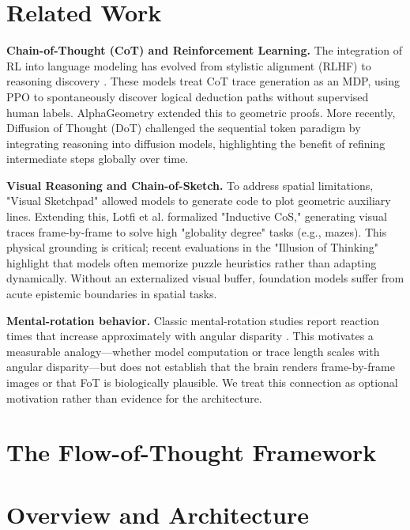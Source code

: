 \documentclass{article}
\begin{document}
\section{Related Work}

\textbf{Chain-of-Thought (CoT) and Reinforcement Learning.} The integration of RL into language modeling has evolved from stylistic alignment (RLHF) \citep{ouyang2022training} to reasoning discovery \citep{deepseek2025deepseekr1, openai2024o1}. These models treat CoT trace generation as an MDP, using PPO to spontaneously discover logical deduction paths without supervised human labels. AlphaGeometry \citep{trinh2024solving} extended this to geometric proofs. More recently, Diffusion of Thought (DoT) \citep{ye2024diffusion} challenged the sequential token paradigm by integrating reasoning into diffusion models, highlighting the benefit of refining intermediate steps globally over time.

\textbf{Visual Reasoning and Chain-of-Sketch.} To address spatial limitations, "Visual Sketchpad" \citep{hu2024visual} allowed models to generate code to plot geometric auxiliary lines. Extending this, Lotfi et al. \cite{lotfi2024cos} formalized "Inductive CoS," generating visual traces frame-by-frame to solve high "globality degree" tasks (e.g., mazes). This physical grounding is critical; recent evaluations in the "Illusion of Thinking" \cite{shojaee2025illusion} highlight that models often memorize puzzle heuristics rather than adapting dynamically. Without an externalized visual buffer, foundation models suffer from acute epistemic boundaries in spatial tasks.

\textbf{Mental-rotation behavior.} Classic mental-rotation studies report reaction times that increase approximately with angular disparity \citep{shepard1971mental}. This motivates a measurable analogy---whether model computation or trace length scales with angular disparity---but does not establish that the brain renders frame-by-frame images or that FoT is biologically plausible. We treat this connection as optional motivation rather than evidence for the architecture.


\section{The Flow-of-Thought Framework}

\section{Overview and Architecture}
\end{document}
